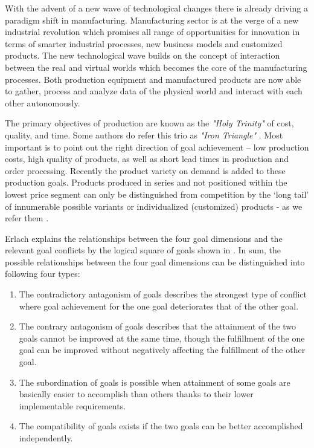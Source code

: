 With the advent of a new wave of technological changes there is already driving a paradigm shift in manufacturing. Manufacturing sector is at the verge of a new industrial revolution which promises all range of opportunities for innovation in terms of smarter industrial processes, new business models and customized products. The new technological wave builds on the concept of interaction between the real and virtual worlds which becomes the core of the manufacturing processes. Both production equipment and manufactured products are now able to gather, process and analyze data of the physical world and interact with each other autonomously.

The primary objectives of production are known as the \textit{"Holy Trinity"} of cost, quality, and time. Some authors do refer this trio as \textit{"Iron Triangle"} \cite{BASUIRON}. Most important is to point out the right direction of goal achievement – low production costs, high quality of products, as well as short lead times in production and order processing. Recently the product variety on demand is added to these production goals. Products produced in series and not positioned within the lowest price segment can only be distinguished from competition by the ‘long tail’ of innumerable possible variants or individualized (customized) products - as we refer them \cite{LEANFAC}.

Erlach \cite{LEANFAC} explains the relationships between the four goal dimensions and the relevant goal conflicts by the logical square of goals shown in . In sum, the possible relationships between the four goal dimensions can be distinguished into following four types:
\begin{enumerate}
	\item The contradictory antagonism of goals describes the strongest type of conflict where goal achievement for the one goal deteriorates that of the other goal.
	\item The contrary antagonism of goals describes that the attainment of the two goals cannot be improved at the same time, though the fulfillment of the one goal can be improved without negatively affecting the fulfillment of the other goal.
	\item The subordination of goals is possible when attainment of some goals are basically easier to accomplish than others thanks to their lower implementable requirements.
	\item The compatibility of goals exists if the two goals can be better accomplished independently.
\end{enumerate}

